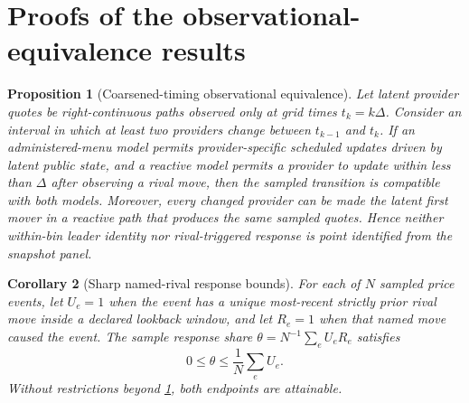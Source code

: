 \documentclass[11pt]{article}
\newcommand{\1}{\mathbf{1}}
\newtheorem{proposition}{Proposition}
\newtheorem{corollary}[proposition]{Corollary}
\begin{document}
\section{Proofs of the observational-equivalence results}
\label{app:coarsening-proof}

\begin{proposition}[Coarsened-timing observational equivalence]
\label{prop:coarsening}
Let latent provider quotes be right-continuous paths observed only at grid times
$t_k=k\Delta$.  Consider an interval in which at least two providers change
between $t_{k-1}$ and $t_k$.  If an administered-menu model permits
provider-specific scheduled updates driven by latent public state, and a reactive
model permits a provider to update within less than $\Delta$ after observing a
rival move, then the sampled transition is compatible with both models.  Moreover,
every changed provider can be made the latent first mover in a reactive path that
produces the same sampled quotes.  Hence neither within-bin leader identity nor
rival-triggered response is point identified from the snapshot panel.
\end{proposition}

\begin{corollary}[Sharp named-rival response bounds]
\label{cor:named-rival-bound}
For each of $N$ sampled price events, let $U_e=1$ when the event has a unique
most-recent strictly prior rival move inside a declared lookback window, and let
$R_e=1$ when that named move caused the event.  The sample response share
$\theta=N^{-1}\sum_e U_eR_e$ satisfies
\begin{equation}
  0\leq\theta\leq \frac{1}{N}\sum_e U_e.
  \label{eq:named-rival-bound}
\end{equation}
Without restrictions beyond \cref{prop:coarsening}, both endpoints are attainable.
\end{corollary}
\end{document}
